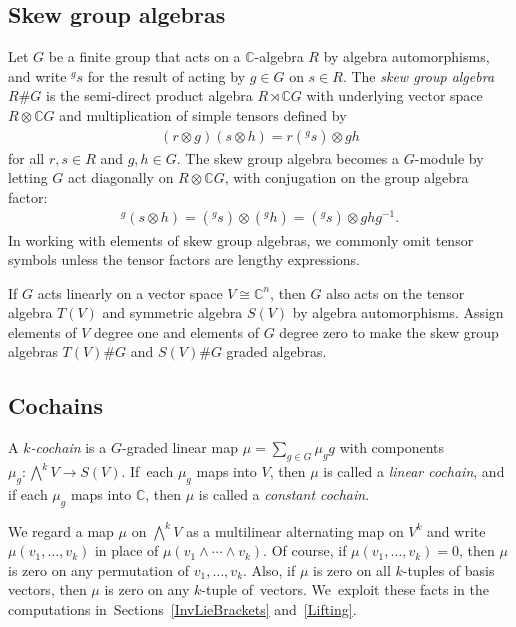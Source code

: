 \documentclass[pdftex]{sigma}
\numberwithin{equation}{section}
\newcommand{\standout}[1]{\textit{#1}} %
\newcommand{\actby}[1]{{}^{#1}}
\begin{document}
\subsection{Skew group algebras}
Let $G$ be a finite group that acts on a $\mathbb{C}$-algebra $R$ by
algebra automorphisms, and write $\actby{g}s$ for the result of acting by $g\in G$ on $s\in R$. The \standout{skew group algebra} $R\#G$ is the
semi-direct product algebra $R\rtimes \mathbb{C} G$ with underlying vector space $R\otimes \mathbb{C} G$ and multiplication of simple tensors defined by
\begin{gather*}
(r\otimes g)(s\otimes h)=r(\actby{g}s)\otimes gh
\end{gather*}
for all $r,s\in R$ and $g,h\in G$.
The skew group algebra becomes a $G$-module by letting $G$ act diagonally on
$R\otimes \mathbb{C} G$, with conjugation on the group algebra factor:
\begin{gather*}
\actby{g}(s\otimes h)=(\actby{g}s)\otimes(\actby{g}h)=(\actby{g}s)\otimes ghg^{-1}.
\end{gather*}
In working with elements of skew group algebras, we commonly omit tensor symbols unless
the tensor factors are lengthy expressions.

If $G$ acts linearly on
a vector space $V\cong\mathbb{C}^n$, then $G$ also acts on the tensor algebra $T(V)$ and
symmetric algebra $S(V)$ by algebra automorphisms.
Assign elements of $V$ degree one and elements of $G$ degree zero
to make the skew group algebras $T(V)\# G$ and $S(V)\# G$ graded algebras.

\subsection{Cochains}%

A \standout{$k$-cochain} is a $G$-graded linear map $\mu=\sum_{g\in G}\mu_g g$ with components $\mu_g\colon \bigwedge^k V\to S(V)$. If~each $\mu_g$ maps into $V$, then $\mu$ is called a
\standout{linear cochain}, and if each $\mu_g$ maps into $\mathbb{C}$, then $\mu$ is called
a \standout{constant cochain}.

We regard a map $\mu$ on $\bigwedge^kV$ as a multilinear alternating map on $V^k$ and write $\mu(v_1,\ldots,v_k)$ in place of $\mu(v_1\wedge\cdots\wedge v_k)$.
Of course, if
$\mu(v_1,\ldots,v_k)=0$, then $\mu$ is zero on any permutation of
$v_1,\ldots,v_k$. Also, if $\mu$ is zero on all $k$-tuples of basis vectors, then $\mu$ is zero on any $k$-tuple of~vectors. We~exploit these facts in the computations in~Sections~\ref{InvLieBrackets} and~\ref{Lifting}.
\end{document}
